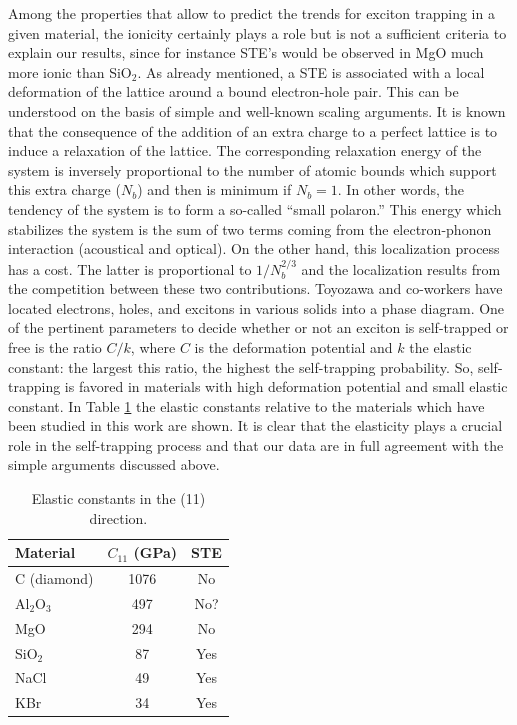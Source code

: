 \documentclass[aps,prb,reprint]{revtex4-2}
\begin{document}
Among the properties that allow to predict the trends for exciton trapping in a given material, the ionicity certainly plays a role but is not a sufficient criteria to explain our results, since for instance STE's would be observed in MgO much more ionic than SiO$_2$. As already mentioned, a STE is associated with a local deformation of the lattice around a bound electron-hole pair. This can be understood on the basis of simple and well-known scaling arguments. It is known that the consequence of the addition of an extra charge to a perfect lattice is to induce a relaxation of the lattice. The corresponding relaxation energy of the system is inversely proportional to the number of atomic bounds which support this extra charge ($N_b$) and then is minimum if $N_b = 1$. In other words, the tendency of the system is to form a so-called ``small polaron.''\cite{42} This energy which stabilizes the system is the sum of two terms coming from the electron-phonon interaction (acoustical and optical). On the other hand, this localization process has a cost. The latter is proportional to $1/N_b^{2/3}$ and the localization results from the competition between these two contributions. Toyozawa and co-workers\cite{43} have located electrons, holes, and excitons in various solids into a phase diagram. One of the pertinent parameters to decide whether or not an exciton is self-trapped or free is the ratio $C/k$, where $C$ is the deformation potential and $k$ the elastic constant: the largest this ratio, the highest the self-trapping probability. So, self-trapping is favored in materials with high deformation potential and small elastic constant. In Table \ref{tab:elastic} the elastic constants relative to the materials which have been studied in this work are shown. It is clear that the elasticity plays a crucial role in the self-trapping process and that our data are in full agreement with the simple arguments discussed above.

\begin{table}[ht]
\centering
\begin{tabular}{lcc}
\toprule
Material & $C_{11}$ (GPa) & STE \\
\midrule
C (diamond) & 1076 & No \\
Al$_2$O$_3$ & 497 & No? \\
MgO & 294 & No \\
SiO$_2$ & 87 & Yes \\
NaCl & 49 & Yes \\
KBr & 34 & Yes \\
\bottomrule
\end{tabular}
\caption{Elastic constants in the (11) direction.}
\label{tab:elastic}
\end{table}
\end{document}
